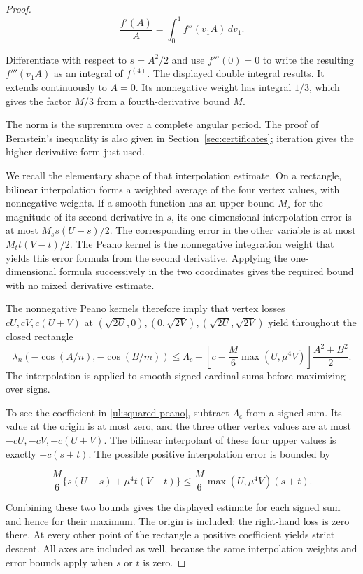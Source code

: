 \begin{proof}
\[
 \frac{f'(A)}A=\int_0^1f''(v_1A)\,dv_1.
\]

Differentiate with respect to $s=A^2/2$ and use $f'''(0)=0$ to
write the resulting $f'''(v_1A)$ as an integral of $f^{(4)}$.
The displayed double integral results.  It extends continuously to
$A=0$.  Its nonnegative weight has integral $1/3$, which gives the
factor $M/3$ from a fourth-derivative bound $M$.

The norm is the supremum over a complete angular period. The proof of
Bernstein's inequality is also given in Section~\ref{sec:certificates};
iteration gives the higher-derivative form just used.

We recall the elementary shape of that interpolation estimate.
On a rectangle, bilinear interpolation forms a weighted average
of the four vertex values, with nonnegative weights.  If a smooth
function has an upper bound $M_s$ for the magnitude of its second
derivative in $s$, its one-dimensional interpolation error is at
most $M_s s(U-s)/2$.  The corresponding error in the other
variable is at most $M_t t(V-t)/2$.  The Peano kernel is the
nonnegative integration weight that yields this error formula
from the second derivative.  Applying the one-dimensional
formula successively in the two coordinates gives the required
bound with no mixed derivative estimate.

The nonnegative Peano kernels therefore imply that vertex losses
$cU,cV,c(U+V)$ at $(\sqrt{2U},0),(0,\sqrt{2V}),
(\sqrt{2U},\sqrt{2V})$ yield throughout the closed rectangle
\begin{equation}\label{ul:squared-peano}
 \lambda_n(-\cos(A/n),-\cos(B/m))
 \leq\Lambda_c-
 \left[c-\frac M6\max(U,\mu^4V)\right]\frac{A^2+B^2}{2}.
\end{equation}
The interpolation is applied to smooth signed cardinal sums before
maximizing over signs.

To see the coefficient in \eqref{ul:squared-peano}, subtract
$\Lambda_c$ from a signed sum.  Its value at the origin is at
most zero, and the three other vertex values are at most
$-cU,-cV,-c(U+V)$.  The bilinear interpolant of these four upper
values is exactly $-c(s+t)$.  The possible positive interpolation
error is bounded by

\[
 \frac M6\{s(U-s)+\mu^4t(V-t)\}
 \leq\frac M6\max(U,\mu^4V)(s+t).
\]

Combining these two bounds gives the displayed estimate for each
signed sum and hence for their maximum.  The origin is included:
the right-hand loss is zero there.  At every other point of the
rectangle a positive coefficient yields strict descent.  All
axes are included as well, because the same interpolation
weights and error bounds apply when $s$ or $t$ is zero.


\end{proof}
